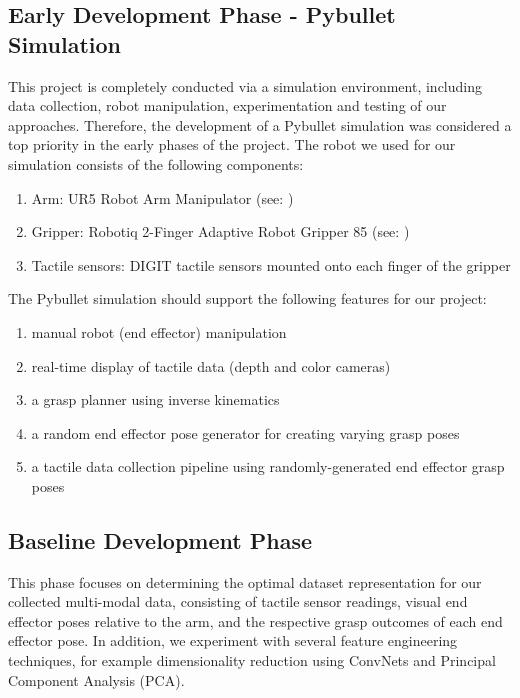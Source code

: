 \documentclass[12pt, a4paper]{report}
\theoremstyle{definition}
\begin{document}
\subsection{Early Development Phase - Pybullet Simulation}
\label{sec:1.4.2}
This project is completely conducted via a simulation environment, including data collection, robot manipulation, experimentation and testing of our approaches. Therefore, the development of a Pybullet simulation was considered a top priority in the early phases of the project. The robot we used for our simulation consists of the following components:
\begin{enumerate}
    \item Arm: UR5 Robot Arm Manipulator (see: \cite{ur5})
    \item Gripper: Robotiq 2-Finger Adaptive Robot Gripper 85 (see: \cite{robotiq})
    \item Tactile sensors: DIGIT tactile sensors \cite{digit} mounted onto each finger of the gripper
\end{enumerate}
The Pybullet simulation should support the following features for our project:
\begin{enumerate}
    \item manual robot (end effector) manipulation
    \item real-time display of tactile data (depth and color cameras)
    \item a grasp planner using inverse kinematics
    \item a random end effector pose generator for creating varying grasp poses
    \item a tactile data collection pipeline using randomly-generated end effector grasp poses
\end{enumerate}


\subsection{Baseline Development Phase}
\label{sec:1.4.3}
This phase focuses on determining the optimal dataset representation for our collected multi-modal data, consisting of tactile sensor readings, visual end effector poses relative to the arm, and the respective grasp outcomes of each end effector pose. In addition, we experiment with several feature engineering techniques, for example dimensionality reduction using ConvNets and Principal Component Analysis (PCA).
\end{document}
